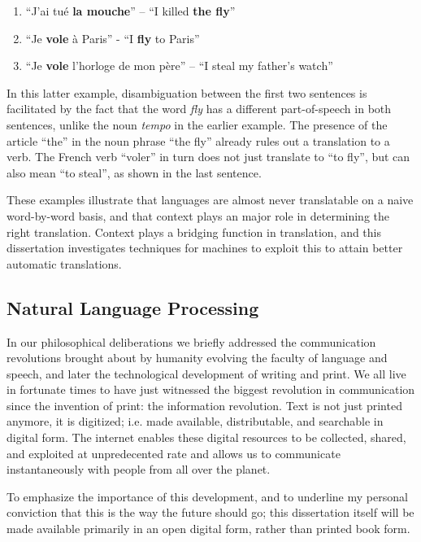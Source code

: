 \begin{enumerate}
\item ``J'ai tué \textbf{la mouche}'' -- ``I killed \textbf{the fly}''
\item ``Je \textbf{vole} à Paris'' - ``I \textbf{fly} to Paris''
\item ``Je \textbf{vole} l'horloge de mon père'' -- ``I steal my father's watch''
\end{enumerate}

In this latter example, disambiguation between the first two sentences is
facilitated by the fact that the word \emph{fly} has a different
part-of-speech in both sentences, unlike the noun \emph{tempo} in the earlier example.
The presence of the article ``the'' in the noun phrase ``the fly'' already
rules out a translation to a verb. The French verb ``voler'' in turn does not
just translate to ``to fly'', but can also mean ``to steal'', as shown in
the last sentence. 

These examples illustrate that languages are almost never translatable on a naive
word-by-word basis, and that context plays an major role in determining the
right translation. Context plays a bridging function in translation, and this
dissertation investigates techniques for machines to exploit this to attain
better automatic translations.

\subsection{Natural Language Processing}

In our philosophical deliberations we briefly addressed the communication
revolutions brought about by humanity evolving the faculty of language and
speech, and later the technological development of writing and print. We all
live in fortunate times to have just witnessed the biggest revolution in
communication since the invention of print: the information revolution. Text is
not just printed anymore, it is digitized; i.e. made available, distributable,
and searchable in digital form. The internet enables these digital resources to
be collected, shared, and exploited at unpredecented rate and allows us to
communicate instantaneously with people from all over the planet. 

To emphasize the importance of this development, and to underline my personal
conviction that this is the way the future should go; this dissertation itself will
be made available primarily in an open digital form, rather than printed book form.

